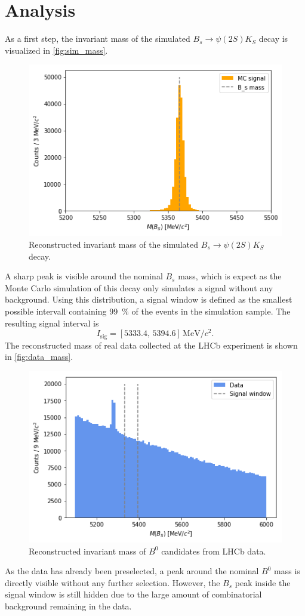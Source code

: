 \section{Analysis}
\label{sec:Analysis}

As a first step, the invariant mass of the simulated $B_s \to \psi(2S)K_S$ decay is visualized in \autoref{fig:sim_mass}.
\begin{figure}[H]
	\centering
	\includegraphics[width=0.5\linewidth]{plots/simulation_mass.png}
	\caption{Reconstructed invariant mass of the simulated $B_s \to \psi(2S)K_S$ decay.}
	\label{fig:sim_mass}
\end{figure}
A sharp peak is visible around the nominal $B_s$ mass, which is expect as the Monte Carlo simulation of this decay only simulates a signal without any background.
Using this distribution, a signal window is defined as the smallest possible intervall containing \qty{99}{\percent} of the events in the simulation sample.
The resulting signal interval is
\begin{equation*}
    I_\text{sig} = [5333.4, \, 5394.6] \, \si{\mega\electronvolt\per c^2}.
\end{equation*}
The reconstructed mass of real data collected at the LHCb experiment is shown in \autoref{fig:data_mass}.
\begin{figure}[H]
	\centering
	\includegraphics[width=0.5\linewidth]{plots/signal_window.png}
	\caption{Reconstructed invariant mass of $B^0$ candidates from LHCb data.}
	\label{fig:data_mass}
\end{figure}
As the data has already been preselected, a peak around the nominal $B^0$ mass is directly visible without any further selection. However, the $B_s$ peak inside the signal window
is still hidden due to the large amount of combinatorial background remaining in the data.

